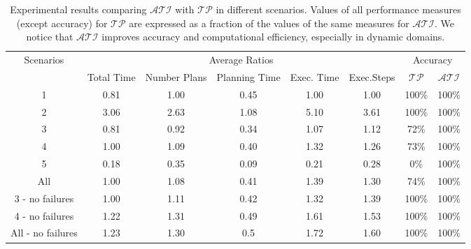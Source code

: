 \documentclass[letterpaper, 10 pt, conference]{ieeeconf}  %
\begin{document}
\begin{table*}[t]
\centering
\small
\setlength\arrayrulewidth{0.5pt}
\begin{tabular}{|c|c|c|c|c|c|c|c|}
 \hline
\multirow{2}{*}{Scenarios}&  \multicolumn{5}{|c|}{Average Ratios} & \multicolumn{2}{|c|}{Accuracy}\\
 \cline{2-8}
&Total Time &Number Plans &Planning Time &Exec. Time &Exec.Steps & $\mathcal{TP}$ & $\mathcal{ATI}$ \\
\hline
 1 &0.81 &1.00 &0.45  &1.00 &1.00 &100\% &100\% \\
 \hline
 2 &3.06 &2.63 &1.08 &5.10 &3.61 &100\% &100\% \\
 \hline
3 &0.81 &0.92 &0.34 &1.07 &1.12 &72\% &100\% \\
 \hline
4 &1.00 &1.09 &0.40 &1.32 &1.26 &73\% &100\% \\
 \hline
5 &0.18 &0.35 &0.09 &0.21 &0.28 &0\%   &100\% \\
 \hline
 All &1.00 & 1.08 &0.41 &1.39 &1.30 &74\% &100\% \\
 \hline
 3 - no failures &1.00 &1.11 &0.42 &1.32 &1.39 &100\% &100\% \\
 \hline
 4 - no failures  &1.22 &1.31 &0.49 &1.61 &1.53 &100\% &100\% \\
 \hline
 All - no failures &1.23&1.30 &0.5 &1.72 &1.60 &100\% &100\% \\
\hline
\end{tabular}
\caption[Results]{Experimental results comparing $\mathcal{ATI}$ with $\mathcal{TP}$ in different scenarios. Values of all performance measures (except accuracy) for $\mathcal{TP}$ are expressed as a fraction of the values of the same measures for $\mathcal{ATI}$. We notice that $\mathcal{ATI}$ improves accuracy and computational efficiency, especially in dynamic domains.}
\label{tab:sim-results}
\end{table*}

\end{document}
